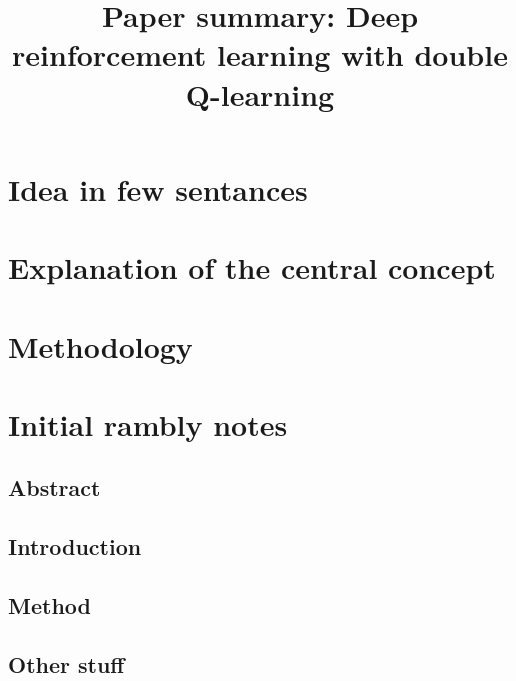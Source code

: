 \documentclass{article}
\title{Paper summary: Deep reinforcement learning with double Q-learning}
\begin{document}
\maketitle


\section{Idea in few sentances}



\section{Explanation of the central concept}




\section{Methodology}


\section{Initial rambly notes}


\subsection{Abstract}

\subsection{Introduction}

\subsection{Method}

\subsection{Other stuff}
\end{document}
